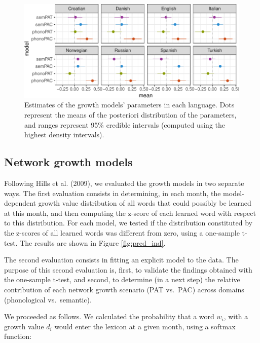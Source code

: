 \documentclass[10pt, letterpaper]{article}
\newenvironment{CodeChunk}{}{}
\begin{document}
\begin{CodeChunk}
\begin{figure}[h]

{\centering \includegraphics{figs/pred_comb_img-1} 

}

\caption{\label{fig:pred_comb_img}Estimates of the growth models' parameters in each language. Dots represent the means of the posteriori distribution of the parameters, and ranges represent 95\% credible intervals (computed using the highest density intervals). }\label{fig:pred_comb_img}
\end{figure}
\end{CodeChunk}

\subsection{Network growth models}\label{network-growth-models}

Following Hills et al. (2009), we evaluated the growth models in two
separate ways. The first evaluation consists in determining, in each
month, the model-dependent growth value distribution of all words that
could possibly be learned at this month, and then computing the z-score
of each learned word with respect to this distribution. For each model,
we tested if the distribution constituted by the z-scores of all learned
words was different from zero, using a one-sample t-test. The results
are shown in Figure \ref{fig:pred_ind}.

The second evaluation consists in fitting an explicit model to the data.
The purpose of this second evaluation is, first, to validate the
findings obtained with the one-sample t-test, and second, to determine
(in a next step) the relative contribution of each network growth
scenario (PAT vs.~PAC) across domains (phonological vs.~semantic).

We proceeded as follows. We calculated the probability that a word
\(w_i\), with a growth value \(d_i\) would enter the lexicon at a given
month, using a softmax function:
\end{document}
